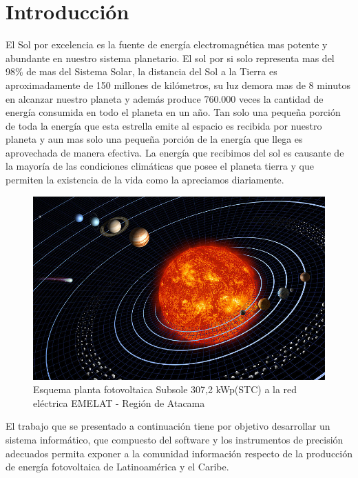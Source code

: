 \chapter{Introducción}
\label{ch:introduccion}

El Sol por excelencia es la fuente de energía electromagnética mas potente y abundante en nuestro sistema planetario. El sol por si solo representa mas del 98\% de mas del Sistema Solar, la distancia del Sol a la Tierra es aproximadamente de 150 millones de kilómetros, su luz demora mas de 8 minutos en alcanzar nuestro planeta y además produce 760.000 veces la cantidad de energía consumida en todo el planeta en un año. Tan solo una pequeña porción de toda la energía que esta estrella emite al espacio es recibida por nuestro planeta y aun mas solo una pequeña porción de la energía que llega es aprovechada de manera efectiva. La energía que recibimos del sol es causante de la mayoría de las condiciones climáticas que posee el planeta tierra y que permiten la existencia de la vida como la apreciamos diariamente.\\

\begin{figure}[h!]
        \centering
        \includegraphics[scale=0.4]{images/solarSis}
        \caption{\tiny Esquema planta fotovoltaica Subsole 307,2 kWp(STC) a la red eléctrica EMELAT - Región de Atacama}
\end{figure}

El trabajo que se presentado a continuación tiene por objetivo desarrollar un sistema informático, que compuesto del software y los instrumentos de precisión adecuados permita exponer a la comunidad información respecto de la producción de energía fotovoltaica de Latinoamérica y el Caribe.\\ 

